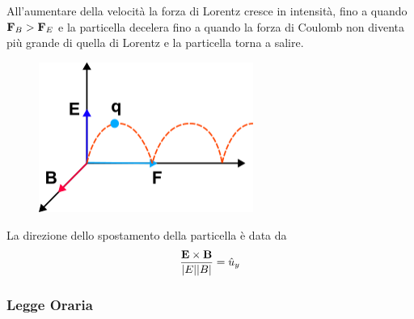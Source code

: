 All'aumentare della velocit\`a la  forza di Lorentz cresce in intensit\`a, fino a quando $\bold{F}_{B} > \bold{F}_{E}$ e la particella decelera fino a quando la forza di Coulomb non diventa pi\`u grande di quella di Lorentz e la particella torna a salire.
 
\begin{figure}[!ht]
\vspace{0.1in}
\includegraphics[width = 7cm]{images/jump}	
\centering
\end{figure}

La direzione dello spostamento della particella \`e data da 
\begin{equation*}
	\frac{\bold{E} \times \bold{B}}{|E||B|} = \hat{u}_y
\end{equation*} 

\subsubsection{Legge Oraria}

